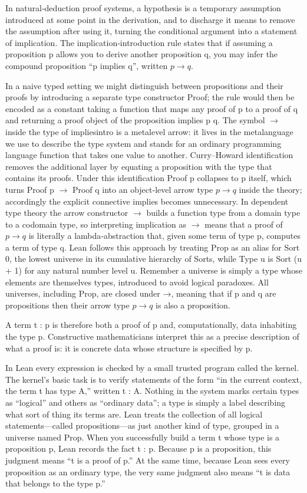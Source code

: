 \documentclass{article}
\newcommand{\1}{\mathbbm{1}}
\theoremstyle{plain}
\theoremstyle{definition}
\numberwithin{equation}{section}
\begin{document}
In natural‑deduction proof systems, a hypothesis is a temporary assumption introduced at some point in the derivation, and to discharge it means to remove the assumption after using it, turning the conditional argument into a statement of implication. The implication‑introduction rule states that if assuming a proposition p allows you to derive another proposition q, you may infer the compound proposition “p implies q”, written $p\rightarrow q$. 

In a naive typed setting we might distinguish between propositions and their proofs by introducing a separate type constructor Proof; the rule would then be encoded as a constant taking a function that maps any proof of p to a proof of q and returning a proof object of the proposition implies p q. The symbol $\rightarrow$ inside the type of impliesintro is a metalevel arrow: it lives in the metalanguage we use to describe the type system and stands for an ordinary programming language function that takes one value to another. Curry–Howard identification removes the additional layer by equating a proposition with the type that contains its proofs. Under this identification Proof p collapses to p itself, which turns Proof p $\rightarrow$ Proof q into an object‑level arrow type $p\rightarrow q$ inside the theory; accordingly the explicit connective implies becomes unnecessary. In dependent type theory the arrow constructor $\rightarrow$ builds a function type from a domain type to a codomain type, so interpreting implication as $\rightarrow$ means that a proof of $p→q$ is literally a lambda‑abstraction that, given some term of type p, computes a term of type q. Lean follows this approach by treating Prop as an alias for Sort 0, the lowest universe in its cumulative hierarchy of Sorts, while Type u is Sort (u + 1) for any natural number level u. Remember a universe is simply a type whose elements are themselves types, introduced to avoid logical paradoxes. All universes, including Prop, are closed under →, meaning that if p and q are propositions then their arrow type $p→q$ is also a proposition. 

A term t : p is therefore both a proof of p and, computationally, data inhabiting the type p. Constructive mathematicians interpret this as a precise description of what a proof is: it is concrete data whose structure is specified by p. 

In Lean every expression is checked by a small trusted program called the kernel. The kernel’s basic task is to verify statements of the form “in the current context, the term t has type A,” written t : A. Nothing in the system marks certain types as “logical” and others as “ordinary data”; a type is simply a label describing what sort of thing its terms are. Lean treats the collection of all logical statements—called propositions—as just another kind of type, grouped in a universe named Prop. When you successfully build a term t whose type is a proposition p, Lean records the fact t : p. Because p is a proposition, this judgment means “t is a proof of p.” At the same time, because Lean sees every proposition as an ordinary type, the very same judgment also means “t is data that belongs to the type p.” 
\end{document}
